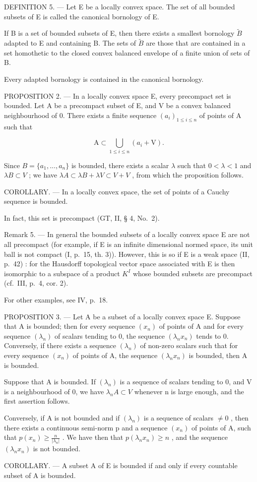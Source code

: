DEFINITION 5. --- Let E be a locally convex space. The set of all bounded subsets of E is called the canonical bornology of E.

If B is a set of bounded subsets of E, then there exists a smallest bornology \(\tilde{B}\) adapted to E and containing B. The sets of \(\tilde{B}\) are those that are contained in a set homothetic to the closed convex balanced envelope of a finite union of sets of B.

Every adapted bornology is contained in the canonical bornology.

PROPOSITION 2. --- In a locally convex space E, every precompact set is bounded. Let A be a precompact subset of E, and V be a convex balanced neighbourhood of 0. There exists a finite sequence \((a_{i})_{1\leqslant i\leqslant n}\) of points of A such that

\[
\mathrm{A} \subset \bigcup_ {1 \leqslant i \leqslant n} (a _ {i} + \mathrm{V}).
\]

Since \(B = \{a_{1}, ..., a_{n}\}\) is bounded, there exists a scalar \(\lambda\) such that \(0 < \lambda < 1\) and \(\lambda B \subset V\) ; we have \(\lambda A \subset \lambda B + \lambda V \subset V + V\) , from which the proposition follows.

COROLLARY. --- In a locally convex space, the set of points of a Cauchy sequence is bounded.

In fact, this set is precompact (GT, II, § 4, No.~2).

Remark 5. --- In general the bounded subsets of a locally convex space E are not all precompact (for example, if E is an infinite dimensional normed space, its unit ball is not compact (I, p.~15, th. 3)). However, this is so if E is a weak space (II, p.~42) : for the Hausdorff topological vector space associated with E is then isomorphic to a subspace of a product \(K^{I}\) whose bounded subsets are precompact (cf.~III, p.~4, cor. 2).

For other examples, see IV, p.~18.

PROPOSITION 3. --- Let A be a subset of a locally convex space E. Suppose that A is bounded; then for every sequence \((x_{n})\) of points of A and for every sequence \((\lambda_{n})\) of scalars tending to 0, the sequence \((\lambda_{n}x_{n})\) tends to 0. Conversely, if there exists a sequence \((\lambda_{n})\) of non-zero scalars such that for every sequence \((x_{n})\) of points of A, the sequence \((\lambda_{n}x_{n})\) is bounded, then A is bounded.

Suppose that A is bounded. If \((\lambda_{n})\) is a sequence of scalars tending to 0, and V is a neighbourhood of 0, we have \(\lambda_{n}A \subset V\) whenever n is large enough, and the first assertion follows.

Conversely, if A is not bounded and if \((\lambda_{n})\) is a sequence of scalars \(\neq 0\) , then there exists a continuous semi-norm p and a sequence \((x_{n})\) of points of A, such that \(p(x_{n}) \geqslant \frac{n}{|\lambda_{n}|}\) . We have then that \(p(\lambda_{n}x_{n}) \geqslant n\) , and the sequence \((\lambda_{n}x_{n})\) is not bounded.

COROLLARY. --- A subset A of E is bounded if and only if every countable subset of A is bounded.

